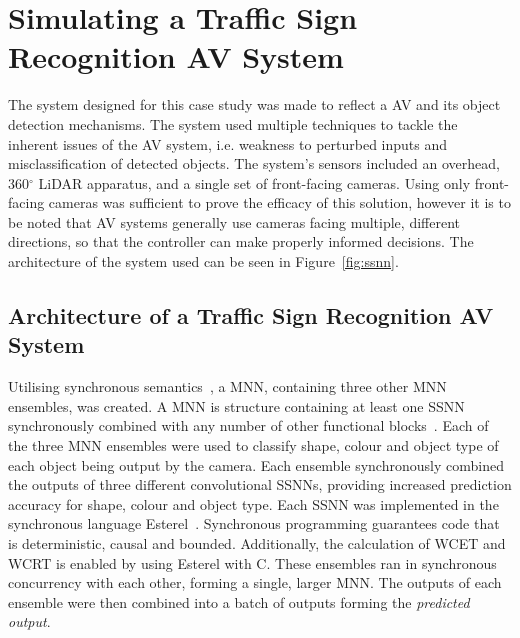 \section{Simulating a Traffic Sign Recognition AV System}
The system designed for this case study was made to reflect a \acf{AV} and its object detection mechanisms. 
The system used multiple techniques to tackle the inherent issues of the \ac{AV} system, i.e. weakness to perturbed inputs and misclassification of detected objects.
The system's sensors included an overhead, 360$^\circ$ \acf{LiDAR} apparatus, and a single set of front-facing cameras.
Using only front-facing cameras was sufficient to prove the efficacy of this solution, however it is to be noted that \ac{AV} systems generally use cameras facing multiple, different directions, so that the controller can make properly informed decisions.
The architecture of the system used can be seen in Figure~\ref{fig:ssnn}. 

\subsection{Architecture of a Traffic Sign Recognition AV System}
Utilising synchronous semantics~\cite{benveniste2003synchronous}, a \acf{MNN}, containing three other \ac{MNN} ensembles, was created.
A \ac{MNN} is structure containing at least one \acf{SSNN}~\cite{sann} synchronously combined with any number of other functional blocks~\cite{sann}.
Each of the three \ac{MNN} ensembles were used to classify shape, colour and object type of each object being output by the camera.
Each ensemble synchronously combined the outputs of three different convolutional \acp{SSNN}, providing increased prediction accuracy for shape, colour and object type. 
Each \ac{SSNN} was implemented in the synchronous language Esterel~\cite{Esterel}.
Synchronous programming guarantees code that is deterministic, causal and bounded.
Additionally, the calculation of \acf{WCET} and \acf{WCRT} is enabled by using Esterel with C.
These ensembles ran in synchronous concurrency with each other, forming a single, larger \ac{MNN}. 
The outputs of each ensemble were then combined into a batch of outputs forming the \textit{predicted output}.

